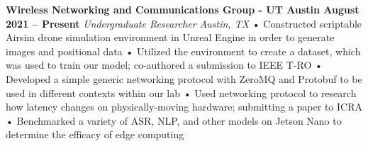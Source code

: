 \documentclass[../main.tex]{subfiles}
\begin{document}
%
\noindent\textbf{{\fontsize{\textFontSize}{\textFontBox}\selectfont Wireless Networking and Communications Group - UT Austin \hfill August 2021 – Present}}
\vspace{-1.5mm}\newline
%
{\fontsize{\textFontSize}{\textFontBox}\selectfont\emph{Undergraduate Researcher \hfill Austin, TX \hspace{0 cm}}}\vspace{0cm}\newline
%
%
{\fontsize{\textFontSize}{\textFontBox}\selectfont • \hspace{1mm} Constructed scriptable Airsim drone simulation environment in Unreal Engine in order to generate images and positional data }\newline
{\fontsize{\textFontSize}{\textFontBox}\selectfont • \hspace{1mm} Utilized the environment to create a dataset, which was used to train our model; co-authored a submission to IEEE T-RO }\newline
{\fontsize{\textFontSize}{\textFontBox}\selectfont • \hspace{1mm} Developed a simple generic networking protocol with ZeroMQ and Protobuf to be used in different contexts within our lab }\newline
{\fontsize{\textFontSize}{\textFontBox}\selectfont • \hspace{1mm} Used networking protocol to research how latency changes on physically-moving hardware; submitting a paper to ICRA }\newline
{\fontsize{\textFontSize}{\textFontBox}\selectfont • \hspace{1mm} Benchmarked a variety of ASR, NLP, and other models on Jetson Nano to determine the efficacy of edge computing }\vspace{-1mm}\newline
%
%
\vspace{-6mm}\newline
%
%
\end{document}
